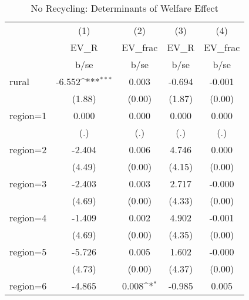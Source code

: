 \begin{table}[htbp]\centering
\def\sym#1{\ifmmode^{#1}\else\(^{#1}\)\fi}
\caption{No Recycling: Determinants of Welfare Effect}
\begin{tabular}{l*{4}{c}}
\hline\hline
                    &\multicolumn{1}{c}{(1)}&\multicolumn{1}{c}{(2)}&\multicolumn{1}{c}{(3)}&\multicolumn{1}{c}{(4)}\\
                    &\multicolumn{1}{c}{EV\_R}&\multicolumn{1}{c}{EV\_frac}&\multicolumn{1}{c}{EV\_R}&\multicolumn{1}{c}{EV\_frac}\\
                    &        b/se         &        b/se         &        b/se         &        b/se         \\
\hline
rural               &      -6.552\sym{***}&       0.003         &      -0.694         &      -0.001         \\
                    &      (1.88)         &      (0.00)         &      (1.87)         &      (0.00)         \\
region=1            &       0.000         &       0.000         &       0.000         &       0.000         \\
                    &         (.)         &         (.)         &         (.)         &         (.)         \\
region=2            &      -2.404         &       0.006         &       4.746         &       0.000         \\
                    &      (4.49)         &      (0.00)         &      (4.15)         &      (0.00)         \\
region=3            &      -2.403         &       0.003         &       2.717         &      -0.000         \\
                    &      (4.69)         &      (0.00)         &      (4.33)         &      (0.00)         \\
region=4            &      -1.409         &       0.002         &       4.902         &      -0.001         \\
                    &      (4.69)         &      (0.00)         &      (4.35)         &      (0.00)         \\
region=5            &      -5.726         &       0.005         &       1.602         &      -0.000         \\
                    &      (4.73)         &      (0.00)         &      (4.37)         &      (0.00)         \\
region=6            &      -4.865         &       0.008\sym{*}  &      -0.985         &       0.005         \\

\end{tabular}
\end{table}
